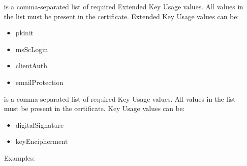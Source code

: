\documentclass[letterpaper,10pt,english]{sphinxmanual}
\begin{document}
\begin{description}
\begin{description}
\begin{quote}
\begin{DUlineblock}{0em}
\item[] 
\item[] 
\item[] 
\item[] 
\item[] 
\end{DUlineblock}
\end{quote}

 is a comma-separated list of
required Extended Key Usage values.  All values in the list
must be present in the certificate.  Extended Key Usage values
can be:
\begin{itemize}
\item {} 
pkinit

\item {} 
msScLogin

\item {} 
clientAuth

\item {} 
emailProtection

\end{itemize}

 is a comma-separated list of required Key
Usage values.  All values in the list must be present in the
certificate.  Key Usage values can be:
\begin{itemize}
\item {} 
digitalSignature

\item {} 
keyEncipherment

\end{itemize}

\end{description}

Examples:


\end{description}
\end{document}
